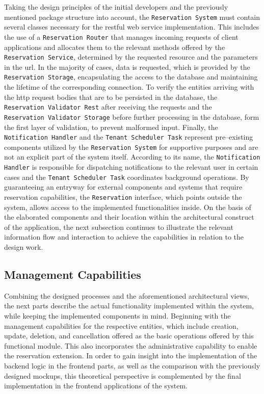 \noindent Taking the design principles of the initial developers and the previously mentioned package structure into account, the \texttt{Reservation System} must contain several classes necessary for the \acrshort{rest}ful web service implementation.
This includes the use of a \texttt{Reservation Router} that manages incoming requests of client applications and allocates them to the relevant methods offered by the \texttt{Reservation Service}, determined by the requested resource and the parameters in the \acrshort{url}.
In the majority of cases, data is requested, which is provided by the \texttt{Reservation Storage}, encapsulating the access to the database and maintaining the lifetime of the corresponding connection.
To verify the entities arriving with the \acrshort{http} request bodies that are to be persisted in the database, the \texttt{Reservation~Validator~Rest} after receiving the requests and the \texttt{Reservation~Validator~Storage} before further processing in the database, form the first layer of validation, to prevent malformed input.
Finally, the \texttt{Notification~Handler} and the \texttt{Tenant~Scheduler~Task} represent pre--existing components utilized by the \texttt{Reservation System} for supportive purposes and are not an explicit part of the system itself.
According to its name, the \texttt{Notification Handler} is responsible for dispatching notifications to the relevant user in certain cases and the \texttt{Tenant Scheduler Task} coordinates background operations. 
By guaranteeing an entryway for external components and systems that require reservation capabilities, the \texttt{Reservation} interface, which points outside the system, allows access to the implemented functionalities inside.
On the basis of the elaborated components and their location within the architectural construct of the application, the next subsection continues to illustrate the relevant information flow and interaction to achieve the capabilities in relation to the design work.

\subsection{Management Capabilities}
\label{ch:Implementation:sec:Reservation System:ssec:Management Capabilities}

Combining the designed processes and the aforementioned architectural views, the next parts describe the actual functionality implemented within the system, while keeping the implemented components in mind.
Beginning with the management capabilities for the respective entities, which include creation, update, deletion, and cancellation offered as the basic operations offered by this functional module. This also incorporates the administrative capability to enable the reservation extension. 
In order to gain insight into the implementation of the backend logic in the frontend parts, as well as the comparison with the previously designed mockups, this theoretical perspective is complemented by the final implementation in the frontend applications of the system.

